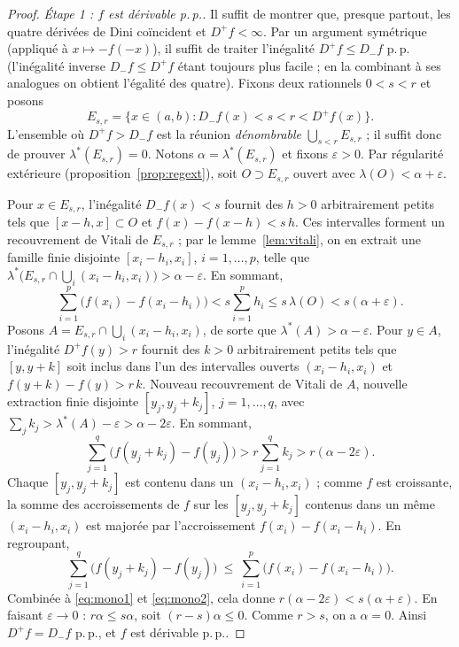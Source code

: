\documentclass[11pt]{article}
\theoremstyle{thmblue}
\theoremstyle{defplain}
\theoremstyle{rem}
\newcommand{\pp}{p.\,p.}
\newcommand{\eps}{\varepsilon}
\newcommand{\lstar}{\lambda^{\!*}}
\begin{document}
\begin{proof}
\emph{Étape 1 : $f$ est dérivable \pp.} Il suffit de montrer que, presque partout, les quatre dérivées
de Dini coïncident et $D^{+}f<\infty$. Par un argument symétrique (appliqué à $x\mapsto-f(-x)$), il
suffit de traiter l'inégalité $D^{+}f\le D_{-}f$ \pp{} (l'inégalité inverse $D_{-}f\le D^{+}f$ étant
toujours plus facile ; en la combinant à ses analogues on obtient l'égalité des quatre). Fixons deux
rationnels $0<s<r$ et posons
\[
E_{s,r}=\{x\in(a,b):D_{-}f(x)<s<r<D^{+}f(x)\}.
\]
L'ensemble où $D^{+}f>D_{-}f$ est la réunion \emph{dénombrable} $\bigcup_{s<r}E_{s,r}$ ; il suffit
donc de prouver $\lstar(E_{s,r})=0$. Notons $\alpha=\lstar(E_{s,r})$ et fixons $\eps>0$. Par
régularité extérieure (proposition~\ref{prop:regext}), soit $O\supset E_{s,r}$ ouvert avec
$\lambda(O)<\alpha+\eps$.

Pour $x\in E_{s,r}$, l'inégalité $D_{-}f(x)<s$ fournit des $h>0$ arbitrairement petits tels que
$[x-h,x]\subset O$ et $f(x)-f(x-h)<s\,h$. Ces intervalles forment un recouvrement de Vitali de
$E_{s,r}$ ; par le lemme~\ref{lem:vitali}, on en extrait une famille finie disjointe
$[x_i-h_i,x_i]$, $i=1,\dots,p$, telle que $\lstar\bigl(E_{s,r}\cap\bigcup_i(x_i-h_i,x_i)\bigr)>\alpha-\eps$.
En sommant,
\begin{equation}\label{eq:mono1}
\sum_{i=1}^{p}\bigl(f(x_i)-f(x_i-h_i)\bigr)<s\sum_{i=1}^{p}h_i\le s\,\lambda(O)<s(\alpha+\eps).
\end{equation}
Posons $A=E_{s,r}\cap\bigcup_i(x_i-h_i,x_i)$, de sorte que $\lstar(A)>\alpha-\eps$. Pour $y\in A$,
l'inégalité $D^{+}f(y)>r$ fournit des $k>0$ arbitrairement petits tels que $[y,y+k]$ soit inclus dans
l'un des intervalles ouverts $(x_i-h_i,x_i)$ et $f(y+k)-f(y)>r\,k$. Nouveau recouvrement de Vitali de
$A$, nouvelle extraction finie disjointe $[y_j,y_j+k_j]$, $j=1,\dots,q$, avec
$\sum_j k_j>\lstar(A)-\eps>\alpha-2\eps$. En sommant,
\begin{equation}\label{eq:mono2}
\sum_{j=1}^{q}\bigl(f(y_j+k_j)-f(y_j)\bigr)>r\sum_{j=1}^{q}k_j>r(\alpha-2\eps).
\end{equation}
Chaque $[y_j,y_j+k_j]$ est contenu dans un $(x_i-h_i,x_i)$ ; comme $f$ est croissante, la somme des
accroissements de $f$ sur les $[y_j,y_j+k_j]$ contenus dans un même $(x_i-h_i,x_i)$ est majorée par
l'accroissement $f(x_i)-f(x_i-h_i)$. En regroupant,
\[
\sum_{j=1}^{q}\bigl(f(y_j+k_j)-f(y_j)\bigr)\ \le\ \sum_{i=1}^{p}\bigl(f(x_i)-f(x_i-h_i)\bigr).
\]
Combinée à \eqref{eq:mono1} et \eqref{eq:mono2}, cela donne $r(\alpha-2\eps)<s(\alpha+\eps)$. En
faisant $\eps\to0$ : $r\alpha\le s\alpha$, soit $(r-s)\alpha\le0$. Comme $r>s$, on a $\alpha=0$.
Ainsi $D^{+}f=D_{-}f$ \pp, et $f$ est dérivable \pp.


\end{proof}
\end{document}
